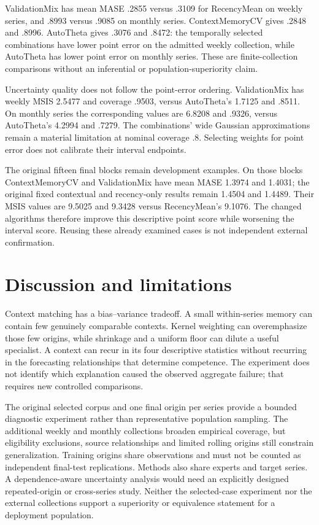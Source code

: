 \documentclass[11pt,a4paper]{article}
\begin{document}
ValidationMix has mean MASE .2855 versus .3109 for RecencyMean on weekly series, and .8993 versus .9085 on monthly series. ContextMemoryCV gives .2848 and .8996. AutoTheta gives .3076 and .8472: the temporally selected combinations have lower point error on the admitted weekly collection, while AutoTheta has lower point error on monthly series. These are finite-collection comparisons without an inferential or population-superiority claim.

Uncertainty quality does not follow the point-error ordering. ValidationMix has weekly MSIS 2.5477 and coverage .9503, versus AutoTheta's 1.7125 and .8511. On monthly series the corresponding values are 6.8208 and .9326, versus AutoTheta's 4.2994 and .7279. The combinations' wide Gaussian approximations remain a material limitation at nominal coverage .8. Selecting weights for point error does not calibrate their interval endpoints.

The original fifteen final blocks remain development examples. On those blocks ContextMemoryCV and ValidationMix have mean MASE 1.3974 and 1.4031; the original fixed contextual and recency-only results remain 1.4504 and 1.4489. Their MSIS values are 9.5025 and 9.3428 versus RecencyMean's 9.1076. The changed algorithms therefore improve this descriptive point score while worsening the interval score. Reusing these already examined cases is not independent external confirmation.



\section{Discussion and limitations}
Context matching has a bias--variance tradeoff. A small within-series memory can contain few genuinely comparable contexts. Kernel weighting can overemphasize those few origins, while shrinkage and a uniform floor can dilute a useful specialist. A context can recur in its four descriptive statistics without recurring in the forecasting relationships that determine competence. The experiment does not identify which explanation caused the observed aggregate failure; that requires new controlled comparisons.

The original selected corpus and one final origin per series provide a bounded diagnostic experiment rather than representative population sampling. The additional weekly and monthly collections broaden empirical coverage, but eligibility exclusions, source relationships and limited rolling origins still constrain generalization. Training origins share observations and must not be counted as independent final-test replications. Methods also share experts and target series. A dependence-aware uncertainty analysis would need an explicitly designed repeated-origin or cross-series study. Neither the selected-case experiment nor the external collections support a superiority or equivalence statement for a deployment population.
\end{document}

